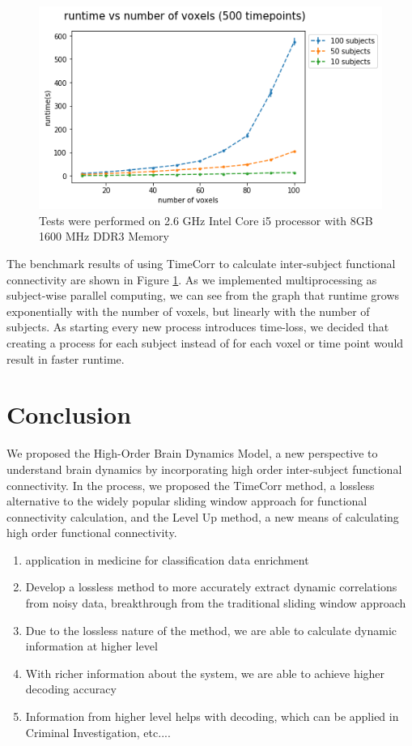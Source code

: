 \documentclass[11pt]{article}
\begin{document}
\begin{figure}[!htb]
\centering
\includegraphics[width=1\textwidth]{../figures/Benchmark/500timepoints.png}
Tests were performed on 2.6 GHz Intel Core i5 processor with 8GB 1600 MHz DDR3 Memory
\label{fig:benchmark}
\end{figure}

The benchmark results of using TimeCorr to calculate inter-subject functional connectivity are shown in Figure \ref{fig:benchmark}. As we implemented multiprocessing as subject-wise parallel computing, we can see from the graph that runtime grows exponentially with the number of voxels, but linearly with the number of subjects. As starting every new process introduces time-loss, we decided that creating a process for each subject instead of for each voxel or time point would result in faster runtime.

\section{Conclusion}
We proposed the High-Order Brain Dynamics Model, a new perspective to understand brain dynamics by incorporating high order inter-subject functional connectivity. In the process, we proposed the TimeCorr method, a lossless alternative to the widely popular sliding window approach for functional connectivity calculation, and the Level Up method, a new means of calculating high order functional connectivity. 
\begin{enumerate}
\item application in medicine for classification data enrichment
\item Develop a lossless method to more accurately extract dynamic correlations from noisy data, breakthrough from the traditional sliding window approach
\item Due to the lossless nature of the method, we are able to calculate dynamic information at higher level
\item With richer information about the system, we are able to achieve higher decoding accuracy
\item Information from higher level helps with decoding, which can be applied in Criminal Investigation, etc....
\end{enumerate}
\end{document}
